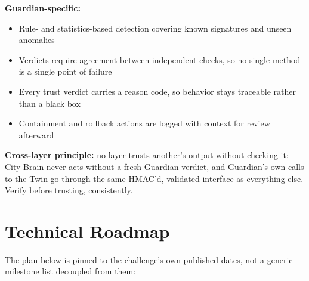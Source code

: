 \documentclass[10pt,letterpaper]{article}
\begin{document}
\textbf{Guardian-specific:}

\begin{itemize}[leftmargin=*]
\item Rule- and statistics-based detection covering known signatures and unseen anomalies
\item Verdicts require agreement between independent checks, so no single method is a single point of failure
\item Every trust verdict carries a reason code, so behavior stays traceable rather than a black box
\item Containment and rollback actions are logged with context for review afterward
\end{itemize}

\textbf{Cross-layer principle:} no layer trusts another's output without checking it: City Brain never acts without a fresh Guardian verdict, and Guardian's own calls to the Twin go through the same HMAC'd, validated interface as everything else. Verify before trusting, consistently.

\section{Technical Roadmap}

The plan below is pinned to the challenge's own published dates, not a generic milestone list decoupled from them:
\end{document}
